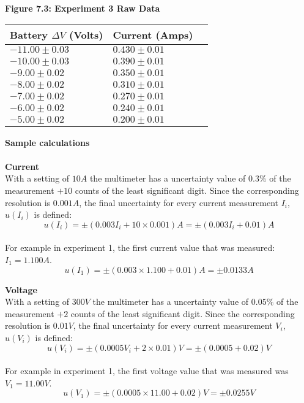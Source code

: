 \documentclass[
	letterpaper, %
	12pt, %
]{CSUniSchoolLabReport}
\begin{document}
\begin{center}
	\textbf{Figure 7.3: Experiment 3 Raw Data}
\end{center}
\begin{center}
	\begin{tabular}{ | l | l | l | }
		\hline
		Battery $\Delta V$ (Volts) & Current (Amps) \\
		\hline
		$-11.00\pm0.03$& $0.430\pm0.01$\\
		$-10.00\pm0.03$& $0.390\pm0.01$\\
		$-9.00\pm0.02$& $0.350\pm0.01$\\
		$-8.00\pm0.02$& $0.310\pm0.01$\\
		$-7.00\pm0.02$& $0.270\pm0.01$\\
		$-6.00\pm0.02$& $0.240\pm0.01$\\
		$-5.00\pm0.02$& $0.200\pm0.01$\\
		\hline
	\end{tabular}
\end{center}
\newpage
{\large\textbf{Sample calculations}}\\\\
\textbf{Current}\\
With a setting of $10A$ the multimeter has a uncertainty value of $0.3\%$ of the measurement $+10$ counts of the least significant digit. Since the corresponding resolution is $0.001A$, the final uncertainty for every current measurement $I_i$, $u(I_i)$ is defined:\\
$$u(I_i) = \pm \left(0.003 I_i +  10 \times 0.001\right)A = \pm\left(0.003I_i + 0.01\right)A$$\\
For example in experiment 1, the first current value that was measured: $I_1 = 1.100A$.
$$ u(I_1) = \pm(0.003 \times 1.100 + 0.01)A = \pm 0.0133A$$

\textbf{Voltage}\\
With a setting of $300V$ the multimeter has a uncertainty value of $0.05\%$ of the measurement $+2$ counts of the least significant digit. Since the corresponding resolution is $0.01V$, the final uncertainty for every current measurement $V_i$, $u(V_i)$ is defined:\\
$$u(V_i) = \pm \left(0.0005 V_i +  2 \times 0.01\right)V = \pm\left(0.0005 + 0.02\right)V$$\\
For example in experiment 1, the first voltage value that was measured was $V_1 = 11.00V$.
$$ u(V_1) = \pm(0.0005 \times 11.00 + 0.02)V = \pm 0.0255V$$\\


\end{document}
